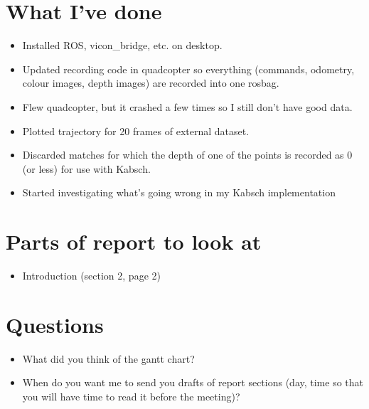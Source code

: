 \documentclass[12pt,a4paper]{article}
\begin{document}
\author{Katrina Ashton}


\pagestyle{fancy}
\fancyhf{}
\rhead{\thepage}

\section{What I've done}
\begin{itemize}
\item Installed ROS, vicon\_bridge, etc. on desktop.
\item Updated recording code in quadcopter so everything (commands, odometry, colour images, depth images) are recorded into one rosbag.
\item Flew quadcopter, but it crashed a few times so I still don't have good data.
\item Plotted trajectory for 20 frames of external dataset.
\item Discarded matches for which the depth of one of the points is recorded as 0 (or less) for use with Kabsch.
\item Started investigating what's going wrong in my Kabsch implementation
\end{itemize}

\section{Parts of report to look at}
\begin{itemize}
\item Introduction (section 2, page 2)
\end{itemize}

\section{Questions}
\begin{itemize}
\item What did you think of the gantt chart?
\item When do you want me to send you drafts of report sections (day, time so that you will have time to read it before the meeting)?
\end{itemize}
\end{document}
